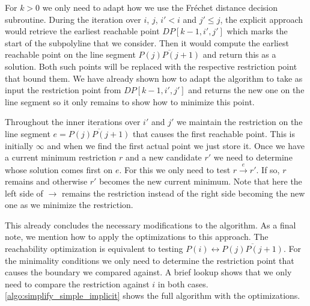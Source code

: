 For \(k > 0\) we only need to adapt how we use the Fréchet distance decision subroutine. During the iteration over \(i\), \(j\), \(i' < i\) and \(j' \leq j\), the explicit approach would retrieve the earliest reachable point \(DP[k-1, i', j']\) which marks the start of the subpolyline that we consider. Then it would compute the earliest reachable point on the line segment \(\overline{P(j)P(j+1)}\) and return this as a solution. Both such points will be replaced with the respective restriction point that bound them. We have already shown how to adapt the algorithm to take as input the restriction point from \(DP[k-1,i',j']\) and returns the new one on the line segment so it only remains to show how to minimize this point. 

Throughout the inner iterations over \(i'\) and \(j'\) we maintain the restriction on the line segment \(e = \overline{P(j)P(j+1)}\) that causes the first reachable point. This is initially \(\infty\) and when we find the first actual point we just store it. Once we have a current minimum restriction \(r\) and a new candidate \(r'\) we need to determine whose solution comes first on \(e\). For this we only need to test \(r \overset e\to r'\). If so, \(r\) remains and otherwise \(r'\) becomes the new current minimum. Note that here the left side of \(\to\) remains the restriction instead of the right side becoming the new one as we minimize the restriction.

This already concludes the necessary modifications to the algorithm. As a final note, we mention how to apply the optimizations to this approach. The reachability optimization is equivalent to testing \(P(i) \leftrightarrow \overline{P(j)P(j+1)}\). For the minimality conditions we only need to determine the restriction point that causes the boundary we compared against. A brief lookup shows that we only need to compare the restriction against \(i\) in both cases. \cref{algo:simplify_simple_implicit} shows the full algorithm with the optimizations.

